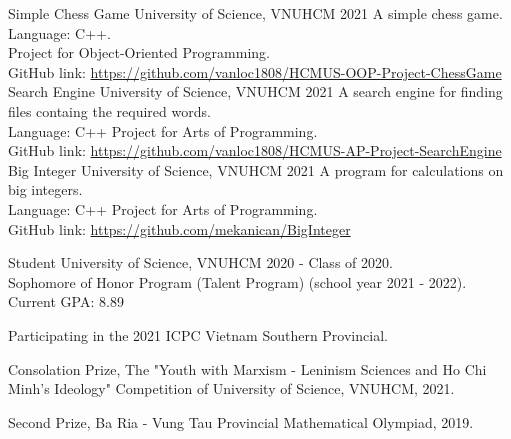 \documentclass[11pt]{spidercv}
\begin{document}
    \begin{MainPart}

    \Experience
        {\ColorHighlight}
		{Simple Chess Game}
		{University of Science, VNUHCM}
        {2021}
        {   
            A simple chess game.\\
            Language: C++.\\
            Project for Object-Oriented Programming.\\
            GitHub link: \url{https://github.com/vanloc1808/HCMUS-OOP-Project-ChessGame}
        }
    \Experience
        {\ColorHighlight}
		{Search Engine}
		{University of Science, VNUHCM}
        {2021}
        {   
            A search engine for finding files containg the required words.\\
            Language: C++
            Project for Arts of Programming.\\
            GitHub link:
            \url{https://github.com/vanloc1808/HCMUS-AP-Project-SearchEngine}
        }
    \Experience
        {\ColorHighlight}
		{Big Integer}
		{University of Science, VNUHCM}
        {2021}
        {   
            A program for calculations on big integers.\\
            Language: C++
            Project for Arts of Programming.\\
            GitHub link: 
            \url{https://github.com/mekanican/BigInteger}
        }


    
    \Experience
        {\ColorHighlight}
		{Student}
		{University of Science, VNUHCM}
        {2020 - \faUndo}
        {   
            Class of 2020.\\
            Sophomore of Honor Program (Talent Program) (school year 2021 - 2022).\\
            Current GPA: 8.89
            }

    \vspace*{0.5cm}
        \begin{ItemList}{\ColorHighlight}
            \item [] Participating in the 2021 ICPC Vietnam Southern Provincial.
            \item [] Consolation Prize, The "Youth with Marxism - Leninism Sciences and Ho Chi Minh's Ideology" Competition of University of Science, VNUHCM, 2021.
            \item [] Second Prize, Ba Ria - Vung Tau Provincial Mathematical Olympiad, 2019.
        \end{ItemList}
        

    \end{MainPart}

    
\end{document}
